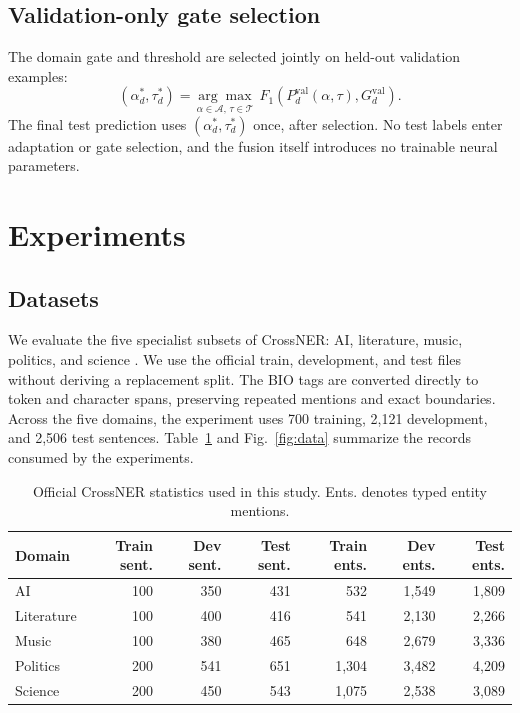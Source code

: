 \documentclass[a4paper,fleqn,numbers,doubleblind]{cas-dc}
\begin{document}
\subsection{Validation-only gate selection}
The domain gate and threshold are selected jointly on held-out validation examples:
\begin{equation}
(\alpha_d^*,\tau_d^*)=\underset{\alpha\in\mathcal{A},\,\tau\in\mathcal{T}}{\arg\max}
\;F_1\!\left(P_d^{\mathrm{val}}(\alpha,\tau),G_d^{\mathrm{val}}\right).
\end{equation}
The final test prediction uses $(\alpha_d^*,\tau_d^*)$ once, after selection. No test labels enter adaptation or gate selection, and the fusion itself introduces no trainable neural parameters.

\section{Experiments}
\subsection{Datasets}
We evaluate the five specialist subsets of CrossNER: AI, literature, music, politics, and science \citep{liu2021crossner}. We use the official train, development, and test files without deriving a replacement split. The BIO tags are converted directly to token and character spans, preserving repeated mentions and exact boundaries. Across the five domains, the experiment uses 700 training, 2,121 development, and 2,506 test sentences. Table~\ref{tab:data} and Fig.~\ref{fig:data} summarize the records consumed by the experiments.

\begin{table}[t]
\centering
\caption{Official CrossNER statistics used in this study. Ents. denotes typed entity mentions.}
\label{tab:data}
\begin{tabular}{lrrrrrr}
\toprule
Domain & Train sent. & Dev sent. & Test sent. & Train ents. & Dev ents. & Test ents.\\
\midrule
AI & 100 & 350 & 431 & 532 & 1,549 & 1,809\\
Literature & 100 & 400 & 416 & 541 & 2,130 & 2,266\\
Music & 100 & 380 & 465 & 648 & 2,679 & 3,336\\
Politics & 200 & 541 & 651 & 1,304 & 3,482 & 4,209\\
Science & 200 & 450 & 543 & 1,075 & 2,538 & 3,089\\
\bottomrule
\end{tabular}
\end{table}
\end{document}
